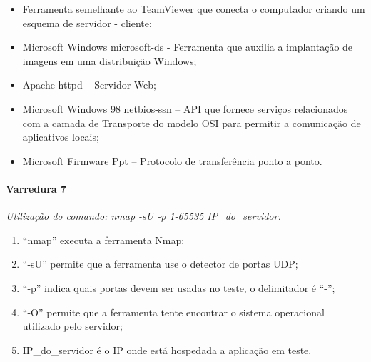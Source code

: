 \documentclass[
    12pt,               %
    openright,          %
    oneside,            %
    a4paper,            %
    section=TITLE,     %
    english,            %
    french,             %
    spanish,            %
    brazil              %
    ]{abntex2}
\begin{document}
\begin{itemize}
	
\item Ferramenta semelhante ao TeamViewer que conecta o computador criando um esquema de servidor - cliente;
	
\item Microsoft Windows microsoft-ds - Ferramenta que auxilia a implantação de imagens em uma distribuição Windows;
	
\item Apache httpd -- Servidor Web;
	
\item Microsoft Windows 98 netbios-ssn -- API que fornece serviços relacionados com a camada de Transporte do modelo OSI para permitir a comunicação de aplicativos locais;
	
\item Microsoft Firmware Ppt -- Protocolo de transferência ponto a ponto.

\end{itemize}


\paragraph*{Varredura 7}

\emph{Utilização do comando: nmap -sU -p 1-65535 IP\_do\_servidor.}



\begin{enumerate}[start=1]
	
\item \textquotedblleft{}nmap\textquotedblright{} executa a ferramenta Nmap;
	
\item \textquotedblleft{}-sU\textquotedblright{} permite que a ferramenta use o detector de portas UDP;
	
\item \textquotedblleft{}-p\textquotedblright{} indica quais portas devem ser usadas no teste, o delimitador é \textquotedblleft{}-\textquotedblright{};
	
\item \textquotedblleft{}-O\textquotedblright{} permite que a ferramenta tente encontrar o sistema operacional utilizado pelo servidor;
	
\item IP\_do\_servidor é o IP onde está hospedada a aplicação em teste.

\end{enumerate}
\end{document}
